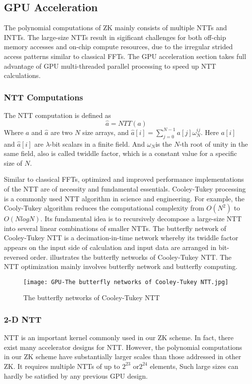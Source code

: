 \subsection{GPU Acceleration}\label{section: gpu-acceleration}
The polynomial computations of ZK mainly consists of multiple NTTs and INTTs. The large-size NTTs result in sigificant challenges for both off-chip memory accesses and on-chip compute resources, due to the irregular strided access patterns similar to classical FFTs. The GPU acceleration section takes full advantage of GPU multi-threaded parallel processing to speed up NTT calculations.
\subsubsection{NTT Computations}
The NTT computation is defined as
\[\hat{a} = NTT{(a)}\]
Where $a$ and  $\hat{a}$ are two $N$ size arrays, and  $\hat{a}[i] = \sum_{j=0}^{N-1} a[j] \omega_N^{ij}$. Here $a[i]$ and $\hat{a}[i]$ are $\lambda$-bit scalars in a finite field. And $\omega_N$is the $N$-th root of unity in the same field, also is called twiddle factor, which is a constant value for a specific size of $N$.

Similar to classical FFTs, optimized and improved performance implementations of the NTT are of necessity and fundamental essentials. Cooley-Tukey processing is a commonly used NTT algorithm in science and engineering. For example, the Cooly-Tukey algorithm reduces the computational complexity from $O(N^2)$ to $O(NlogN)$. Its fundamental idea is to recursively decompose a large-size NTT into several linear combinations of smaller NTTs. The butterfly network of Cooley-Tukey NTT is a decimation-in-time network whereby its twiddle factor appears on the input side of calculation and input data are arranged in bit-reversed order.  illustrates the butterfly networks of Cooley-Tukey NTT. The NTT optimization mainly involves butterfly network and butterfly computing.
\begin{figure}[!ht]
    \centering
    \texttt{[image: GPU-The butterfly networks of Cooley-Tukey NTT.jpg]}
    \caption{The butterfly networks of Cooley-Tukey NTT}
    \label{fig:The Butterfly Networks of Cooley-Tukey NTT}
\end{figure}
\subsubsection{2-D NTT}
NTT is an important kernel commonly used in our ZK scheme. In fact, there exist many accelerator designs for NTT. However, the polynomial computations in our ZK scheme have substantially larger scales than those addressed in other ZK. It requires multiple NTTs of up to $2^{23}$ or$2^{24}$ elements, Such large sizes can hardly be satisfied by any previous GPU design.

